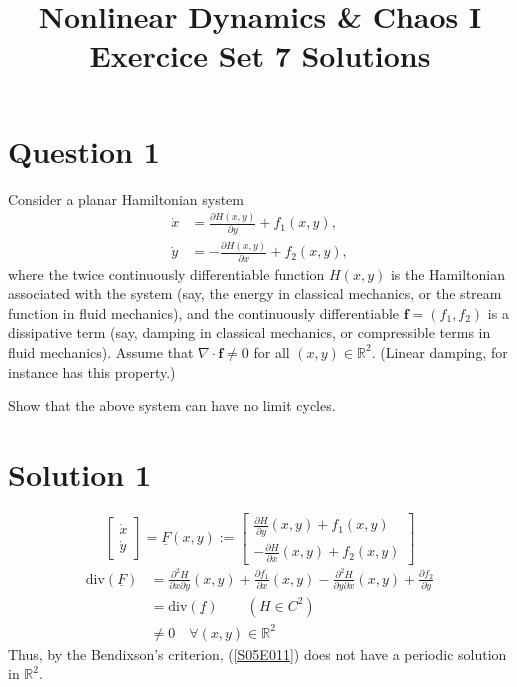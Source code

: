 \documentclass[twoside,10pt,a4paper]{article}
\title{\huge \textbf{Nonlinear Dynamics \& Chaos I \\ \Large Exercice Set 7 Solutions}}	%
\author{ }		%
\date{ }	%
\begin{document}
\maketitle

\section*{Question 1}
Consider a planar Hamiltonian system
\begin{align*}
	\dot{x} &= \frac{\partial H(x,y)}{\partial y} + f_1(x,y), \\
	\dot{y} &= - \frac{\partial H(x,y)}{\partial x} + f_2(x,y),
\end{align*}
where the twice continuously differentiable function $H(x,y)$ is the Hamiltonian associated with the system (say, the energy in classical mechanics, or the stream function in fluid mechanics), and the continuously differentiable $\mathbf{f} = (f_1, f_2)$ is a dissipative term (say, damping in classical mechanics, or compressible terms in fluid mechanics). Assume that $\nabla \cdot \mathbf{f} \neq 0$ for all $(x,y) \in \mathbb{R}^2$. (Linear damping, for instance has this property.)

Show that the above system can have no limit cycles.

\section*{Solution 1}
\begin{equation}
	\begin{bmatrix}\label{S05E011}
		\dot{x} \\
		\dot{y}
	\end{bmatrix} =
	\underline{F}(x,y) := \begin{bmatrix}
		\displaystyle \frac{\partial H}{\partial y}(x,y) + f_1(x,y) \\
		\displaystyle -\frac{\partial H}{\partial x}(x,y) + f_2(x,y)
	\end{bmatrix}
\end{equation}
\begin{align*}
	\text{div}(\underline{F}) &= \frac{\partial^2 H}{\partial x \partial y}(x,y) + \frac{\partial f_1}{\partial x}(x,y) - \frac{\partial^2 H}{\partial y \partial x}(x,y) + \frac{\partial f_2}{\partial y} \\
	&= \text{div}(\underline{f}) \qquad (H \in C^2) \\
	&\neq 0 \quad \forall (x,y)\in \mathbb{R}^2
\end{align*}
Thus, by the Bendixson's criterion, (\ref{S05E011}) does not have a periodic solution in $\mathbb{R}^2$.
\end{document}
